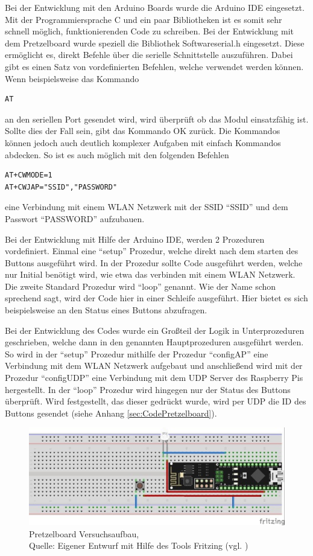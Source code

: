 Bei der Entwicklung mit den Arduino Boards wurde die Arduino IDE eingesetzt.
Mit der Programmiersprache C und ein paar Bibliotheken ist es somit sehr schnell möglich, funktionierenden Code zu schreiben.
Bei der Entwicklung mit dem Pretzelboard wurde speziell die Bibliothek Softwareserial.h eingesetzt.
Diese ermöglicht es, direkt Befehle über die serielle Schnittstelle auszuführen.
Dabei gibt es einen Satz von vordefinierten Befehlen, welche verwendet werden können.
Wenn beispielsweise das Kommando 
\begin{lstlisting}
AT
\end{lstlisting}
an den seriellen Port gesendet wird, wird überprüft ob das Modul einsatzfähig ist.
Sollte dies der Fall sein, gibt das Kommando OK zurück.
Die Kommandos können jedoch auch deutlich komplexer Aufgaben mit einfach Kommandos abdecken.
So ist es auch möglich mit den folgenden Befehlen
\begin{lstlisting}
AT+CWMODE=1
AT+CWJAP="SSID","PASSWORD"
\end{lstlisting}
eine Verbindung mit einem \ac{WLAN} Netzwerk mit der SSID ``SSID'' und dem Passwort ``PASSWORD'' aufzubauen.

Bei der Entwicklung mit Hilfe der Arduino \ac{IDE}, werden 2 Prozeduren vordefiniert.
Einmal eine "`setup"' Prozedur, welche direkt nach dem starten des Buttons ausgeführt wird.
In der Prozedur sollte Code ausgeführt werden, welche nur Initial benötigt wird, wie etwa das verbinden mit einem \ac{WLAN} Netzwerk.
Die zweite Standard Prozedur wird "`loop"' genannt.
Wie der Name schon sprechend sagt, wird der Code hier in einer Schleife ausgeführt.
Hier bietet es sich beispielsweise an den Status eines Buttons abzufragen.

Bei der Entwicklung des Codes wurde ein Großteil der Logik in Unterprozeduren geschrieben, welche dann in den genannten Hauptprozeduren ausgeführt werden.
So wird in der "`setup"' Prozedur mithilfe der Prozedur "`configAP"' eine Verbindung mit dem \ac{WLAN} Netzwerk aufgebaut und anschließend wird mit der Prozedur "`configUDP"' eine Verbindung mit dem \ac{UDP} Server des Raspberry Pis hergestellt.
In der "`loop"' Prozedur wird hingegen nur der Status des Buttons überprüft.
Wird festgestellt, das dieser gedrückt wurde, wird per \ac{UDP} die ID des Buttons gesendet 
(siehe Anhang \ref{sec:CodePretzelboard}).

\begin{figure}[H]
	\centering
	\includegraphics[scale=1.5]{Pretzel_Fritzing.jpg}
	\caption[Pretzelboard Versuchsaufbau]{Pretzelboard Versuchsaufbau,\\ Quelle: Eigener Entwurf mit Hilfe des Tools Fritzing (vgl. \cite{.fritz})}
\end{figure}